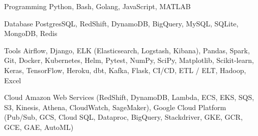 

\begin{cvskills}

  \cvskill
    {Programming} %
    {Python, Bash, Golang, JavaScript, MATLAB} %

  \cvskill
    {Database} %
    {PostgresSQL, RedShift, DynamoDB, BigQuery, MySQL, SQLite, MongoDB, Redis} %

  \cvskill
    {Tools} %
    {Airflow, Django, ELK (Elasticsearch, Logstash, Kibana), Pandas, Spark, Git, Docker, Kubernetes, Helm, Pytest, NumPy, SciPy, Matplotlib, Scikit-learn, Keras, TensorFlow, Heroku, dbt, Kafka, Flask, CI/CD, ETL / ELT, Hadoop, Excel} %






  \cvskill
    {Cloud} %
    {Amazon Web Services (RedShift, DynamoDB, Lambda, ECS, EKS, SQS, S3, Kinesis, Athena, CloudWatch, SageMaker),
    Google Cloud Platform (Pub/Sub, GCS, Cloud SQL, Dataproc, BigQuery, Stackdriver, GKE, GCR, GCE, GAE, AutoML)} 


\end{cvskills}
